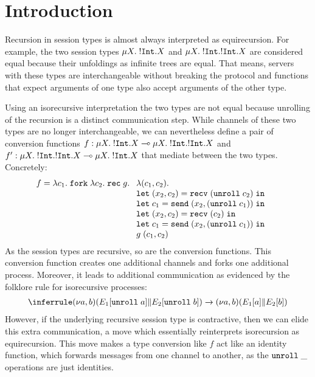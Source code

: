 
\section{Introduction}
\label{sec:introduction}

Recursion in session types is almost always interpreted as
equirecursion. For example, the two session types $\mu X.\;{{}!\mathtt{Int}.X} $
and $\mu X.\;{{}!\mathtt{Int}.{}!\mathtt{Int}.X} $ are considered equal because
their unfoldings as infinite trees are equal. That means, servers with
these types are interchangeable without breaking the protocol and
functions that expect arguments of one type also accept arguments of
the other type.

Using an isorecursive interpretation the two types are not equal
because unrolling of the recursion is a distinct communication
step. While channels of these two types are no longer
interchangeable, we can nevertheless define a pair of conversion
functions
$f : \mu X.\;{{}!\mathtt{Int}.X} \multimap \mu X.\;{{}!\mathtt{Int}.{}!\mathtt{Int}.X}$
and
$f' : \mu X.\;{{}!\mathtt{Int}.{}!\mathtt{Int}.X} \multimap \mu X.\;{{}!\mathtt{Int}.X}$
that mediate between the two types. Concretely:
\begin{align*}
  f &=       \ELam {c_1} \EFork{ \ELam {c_2} \ERec g %
      \begin{array}[t]{l}
      \ELam{(c_1, c_2)} \\
      \ELet{(x_2,c_2)}{\ERecv{(\EUnroll{c_2})}} \\
      \ELet{c_1}{\ESend{x_2}{(\EUnroll{c_1})}} \\
      \ELet{(x_2,c_2)}{\ERecv{({c_2})}} \\
      \ELet{c_1}{\ESend{x_2}{(\EUnroll{c_1})}} \\
        g \; ({c_1}, {c_2}) %
      \end{array}}
\end{align*}
As the session types are recursive, so are the conversion
functions. This conversion function creates one additional
channels and forks one additional process. Moreover, it leads to
additional communication as evidenced by the folklore rule for
isorecursive processes:
\begin{gather*}
  \reducerule{
    \PScope (\PPar* {\EUnroll a} {\EUnroll b})
  }{
    \PScope (\PPar* a b)
  }
\end{gather*}
However, if the underlying recursive session type is contractive, then we can
elide this extra communication, a move which essentially reinterprets
isorecursion as equirecursion.
This move makes a type conversion like $f$ act like an identity
function, which forwards messages from one channel to another, as the
$\mathtt{unroll}\; \_$ operations are just identities. 


